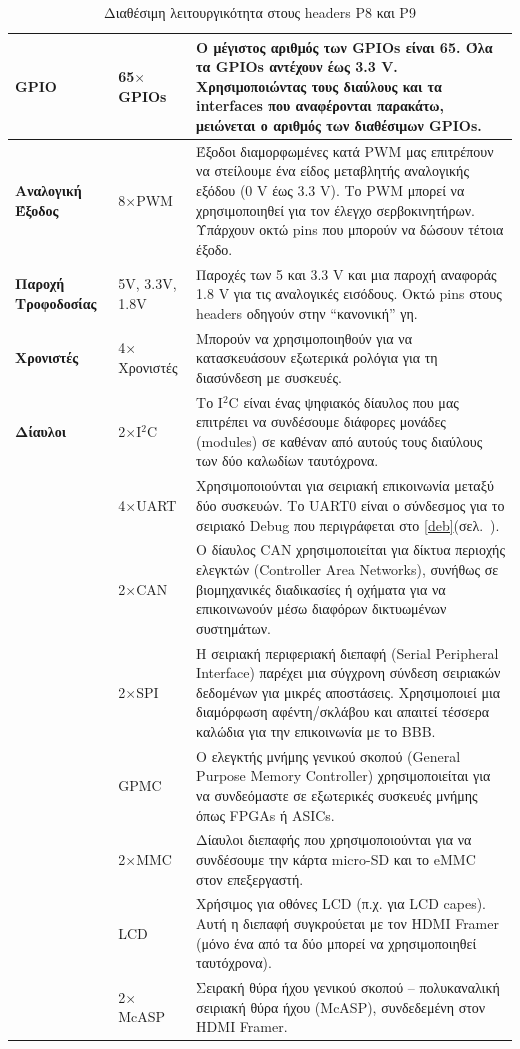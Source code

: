 \documentclass[12pt, a4paper, oneside]{report}
\begin{document}
\begin{table}
\centering
\footnotesize
{\renewcommand{\arraystretch}{1.5}
\renewcommand{\tabcolsep}{0.2cm}
\begin{tabular}{|C{1.5cm}|C{2cm}|L{10cm}|}
\hline
\textbf{GPIO} & 65$\times$GPIOs & Ο μέγιστος αριθμός των GPIOs είναι 65. Όλα τα GPIOs αντέχουν έως 3.3 V. Χρησιμοποιώντας τους διαύλους και τα interfaces που αναφέρονται παρακάτω, μειώνεται ο αριθμός των διαθέσιμων GPIOs.\\ \hline
\textbf{Αναλογική Έξοδος} & 8$\times$PWM & Έξοδοι διαμορφωμένες κατά PWM μας επιτρέπουν να στείλουμε ένα είδος μεταβλητής αναλογικής εξόδου (0 V έως 3.3 V). Το PWM μπορεί να χρησιμοποιηθεί για τον έλεγχο σερβοκινητήρων. Υπάρχουν οκτώ pins που μπορούν να δώσουν τέτοια έξοδο.\\ \hline
\textbf{Παροχή Τροφοδοσίας} & 5V, 3.3V, 1.8V & Παροχές των 5 και 3.3 V και μια παροχή αναφοράς 1.8 V για τις αναλογικές εισόδους. Οκτώ pins στους headers οδηγούν στην ``κανονική'' γη.\\ \hline
\textbf{Χρονιστές} & 4$\times$Χρονιστές & Μπορούν να χρησιμοποιηθούν για να κατασκευάσουν εξωτερικά ρολόγια για τη διασύνδεση με συσκευές.\\ \hline
\textbf{Δίαυλοι} & 2$\times$I$^2$C & Το I$^2$C είναι ένας ψηφιακός δίαυλος που μας επιτρέπει να συνδέσουμε διάφορες μονάδες (modules) σε καθέναν από αυτούς τους διαύλους των δύο καλωδίων ταυτόχρονα.\\ 
 & 4$\times$UART & Χρησιμοποιούνται για σειριακή επικοινωνία μεταξύ δύο συσκευών. Το UART0 είναι ο σύνδεσμος για το σειριακό Debug που περιγράφεται στο \ref{deb}(σελ.~\pageref{deb}).\\ 
 & 2$\times$CAN & Ο δίαυλος CAN χρησιμοποιείται για δίκτυα περιοχής ελεγκτών (Controller Area Networks), συνήθως σε βιομηχανικές διαδικασίες ή οχήματα για να επικοινωνούν μέσω διαφόρων δικτυωμένων συστημάτων.\\ 
 & 2$\times$SPI & Η σειριακή περιφεριακή διεπαφή (Serial Peripheral Interface) παρέχει μια σύγχρονη σύνδεση σειριακών δεδομένων για μικρές αποστάσεις. Χρησιμοποιεί μια διαμόρφωση αφέντη\slash σκλάβου και απαιτεί τέσσερα καλώδια για την επικοινωνία με το BBB.\\ 
 & GPMC & Ο ελεγκτής μνήμης γενικού σκοπού (General Purpose Memory Controller) χρησιμοποιείται για να συνδεόμαστε σε εξωτερικές συσκευές μνήμης όπως FPGAs ή ASICs.\\ 
 & 2$\times$MMC & Δίαυλοι διεπαφής που χρησιμοποιούνται για να συνδέσουμε την κάρτα micro-SD και το eMMC στον επεξεργαστή.\\ 
 & LCD & Χρήσιμος για οθόνες LCD (π.χ. για LCD capes). Αυτή η διεπαφή συγκρούεται με τον HDMI Framer (μόνο ένα από τα δύο μπορεί να χρησιμοποιηθεί ταυτόχρονα).\\ 
 & 2$\times$McASP & Σειρακή θύρα ήχου γενικού σκοπού -- πολυκαναλική σειριακή θύρα ήχου (McASP), συνδεδεμένη στον HDMI Framer.\\
\hline
\end{tabular}
}
\caption{Διαθέσιμη λειτουργικότητα στους headers P8 και P9}\label{pinakas}
\end{table}
\clearpage
\end{document}
